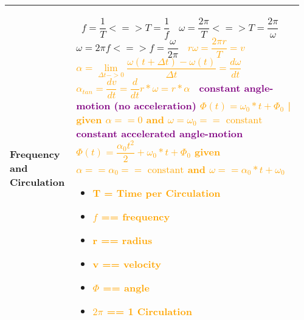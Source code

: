\documentclass[main.tex,fontsize=8pt,paper=a4,paper=portrait,DIV=calc,]{scrartcl}
\begin{document}
\pagebreak
\begin{table}[ht!]
\begin{tabular}{|m{0.2\linewidth}|m{0.755\linewidth}|}
\hline
Frequency and Circulation &
\, \newline
\huge \( f = \dfrac{1}{T} <=> T = \dfrac{1}{f} \)\newline
\, \newline
\huge \( \omega = \dfrac{2\pi}{T} <=> T = \dfrac{2\pi}{\omega} \)\newline
\, \newline
\huge \( \omega = 2\pi f <=> f = \dfrac{\omega}{2\pi} \)\newline
\, \newline
\huge \textcolor{orange}{\( r \omega = \dfrac{2\pi r}{T} = v \)}\newline
\, \newline
\huge \textcolor{orange}{\( \alpha = \underset{\Delta t -> 0}{\lim} \dfrac{\omega (t + \Delta t) - \omega (t)}{\Delta t} = \dfrac{d\omega}{dt} \)}\newline 
\, \newline
\huge \textcolor{orange}{\( \alpha_{tan} = \dfrac{dv}{dt} = \dfrac{d}{dt}r * \omega = r * \alpha \)}\newline 
\, \newline
\textcolor{purple}{constant angle-motion (no acceleration)}\newline
\huge \textcolor{orange}{\( \Phi(t) = \omega_0 * t + \Phi_0 \)  | given \(\alpha == 0 \) and \( \omega = \omega_0 == \text{ constant} \)}\newline
\, \newline
\textcolor{purple}{constant accelerated angle-motion}\newline
\huge \textcolor{orange}{\( \Phi(t) = \dfrac{\alpha_0 t^2}{2} + \omega_0 * t + \Phi_0 \) \newline given \( \alpha == \alpha_0 == \text{ constant} \) and \(\omega == \alpha_0 * t + \omega_0 \) }\newline
\, \newline \normalsize
\begin{itemize}
\item \textcolor{orange}{T = Time per Circulation}
\item \textcolor{orange}{\(f\) == frequency}
\item \textcolor{orange}{r == radius}
\item \textcolor{orange}{v == velocity}
\item \textcolor{orange}{\(\Phi\) == angle}
\item \textcolor{orange}{\(2\pi\) == 1 Circulation}
\end{itemize}\\
\hline
\end{tabular}

\end{table}
\end{document}
